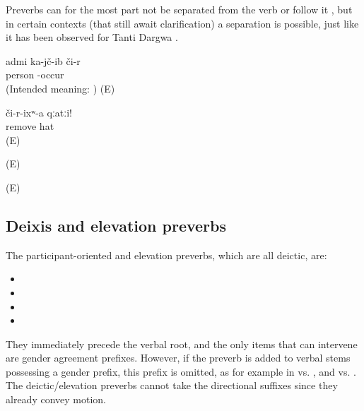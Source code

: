 Preverbs can for the most part not be separated from the verb or follow it , but in certain contexts (that still await clarification) a separation is possible, just like it has been observed for Tanti Dargwa \citep[107]{Sumbatova.Lander2014} .
%
\begin{exe}
	\ex	\label{ex:The man fell down ungrammatical verbs}
	\gll	{*}	admi	ka-jč-ib či-r\\
		{}	person	-occur	\\
	\glt	(Intended meaning: ) (E)

	\ex	\label{ex:Take off the hat verbs}
	\begin{xlist}
		\ex	\label{ex:Take off the hat verbs@A}
		\gll	či-r-ixʷ-a	qːatːi!\\
			remove	hat\\
		\glt	{} (E)

		\ex	{}	\label{ex:Take off the hat verbs@B}
		\glt	{} (E)

		\ex	{}	\label{ex:Take off the hat verbs@C}
		\glt	{} (E)
	\end{xlist}
\end{exe}



\subsection{Deixis and elevation preverbs}
\label{ssec:Deixis/gravitation preverbs}

The participant-oriented and elevation preverbs, which are all deictic, are:
%
\begin{itemize}
	\item	{} 
	\item	{} 
	\item	{} 
	\item	{} 
\end{itemize}

They immediately precede the verbal root, and the only items that can intervene are gender agreement prefixes. However, if the preverb  is added to verbal stems possessing a gender prefix, this prefix is omitted, as for example in   vs.  , and   vs.  . The deictic/elevation preverbs cannot take the directional suffixes since they already convey motion.

